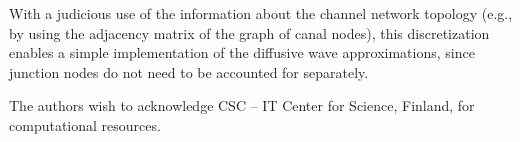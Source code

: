 \documentclass[bg, manuscript]{copernicus}
\begin{document}
With a judicious use of the information about the channel network topology (e.g., by using the adjacency matrix of the graph of canal nodes), this discretization enables a simple implementation of the diffusive wave approximations, since junction nodes do not need to be accounted for separately.


\noappendix       %




\appendixfigures  %

\appendixtables   %







\begin{acknowledgements}
The authors wish to acknowledge CSC -- IT Center for Science, Finland, for computational resources.
\end{acknowledgements}





\end{document}
